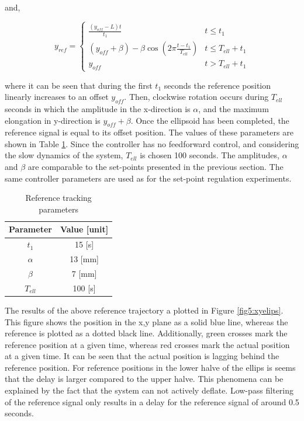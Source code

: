 and,


\begin{equation}
    y_{ref} = \begin{cases} 
      \frac{(y_{off} - L) t}{t_1} &  t \leq t_1 \\
     (y_{off} +\beta) -  \beta \cos(2\pi \frac{t - t_1}{T_{ell}}) & t \leq T_{ell} + t_1 \\
     y_{off} & t > T_{ell} + t_1
   \end{cases} 
\end{equation}


where it can be seen that during the first $t_1$ seconds the reference position linearly increases to an offset $y_{off}$. Then, clockwise rotation occurs during $T_{ell}$ seconds in which the amplitude in the x-direction is $\alpha$, and the maximum elongation in y-direction is $y_{off} + \beta$. Once the ellipsoid has been completed, the reference signal is equal to its offset position. The values of these parameters are shown in Table \ref{tab5:refparams}. Since the controller has no feedforward control, and considering the slow dynamics of the system, $T_{ell}$ is chosen 100 seconds. The amplitudes, $\alpha$ and $\beta$ are comparable to the set-points presented in the previous section. The same controller parameters are used as for the set-point regulation experiments.


\begin{table}[H]
    \centering
    \caption{Reference tracking parameters}
    \begin{tabular}{|c|c|} \hline
   \textbf{Parameter}  & \textbf{Value [unit]} \\ \hline
    $t_1$ &   15 [s]  \\ 
    $\alpha$ & 13 [mm] \\
    $\beta$ & 7 [mm] \\
    $T_{ell}$ & 100 [s] \\ \hline
\end{tabular}
    \label{tab5:refparams}
\end{table}

The results of the above reference trajectory a plotted in Figure \ref{fig5:xyelips}. This figure shows the position in the x,y plane as a solid blue line, whereas the reference is plotted as a dotted black line. Additionally, green crosses mark the reference position at a given time, whereas red crosses mark the actual position at a given time. It can be seen that the actual position is lagging behind the reference position. For reference positions in the lower halve of the ellips is seems that the delay is larger compared to the upper halve. This phenomena can be explained by the fact that the system can not actively deflate. 
Low-pass filtering of the reference signal only results in a delay for the reference signal of around 0.5 seconds. 


